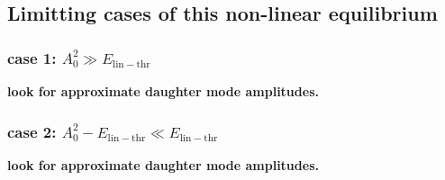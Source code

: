 \subsection*{Limitting cases of this non-linear equilibrium}

\subsubsection*{case 1: $A_0^2 \gg E_{\mathrm{lin-thr}}$}

\textbf{look for approximate daughter mode amplitudes.}

\subsubsection*{case 2: $A_0^2 -  E_{\mathrm{lin-thr}} \ll  E_{\mathrm{lin-thr}}$}

\textbf{look for approximate daughter mode amplitudes.}

